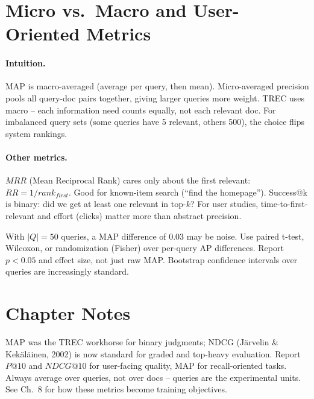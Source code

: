 
\section{Micro vs.\ Macro and User-Oriented Metrics}\label{sec:micro-macro}
\paragraph{Intuition.} MAP is macro-averaged (average per query, then mean). Micro-averaged precision pools all query-doc pairs together, giving larger queries more weight. TREC uses macro -- each information need counts equally, not each relevant doc. For imbalanced query sets (some queries have 5 relevant, others 500), the choice flips system rankings.

\paragraph{Other metrics.} $MRR$ (Mean Reciprocal Rank) cares only about the first relevant: $RR=1/rank_{first}$. Good for known-item search (``find the homepage''). Success@k is binary: did we get at least one relevant in top-$k$? For user studies, time-to-first-relevant and effort (clicks) matter more than abstract precision.

\begin{remark}
With $|Q|=50$ queries, a MAP difference of 0.03 may be noise. Use paired t-test, Wilcoxon, or randomization (Fisher) over per-query AP differences. Report $p<0.05$ and effect size, not just raw MAP. Bootstrap confidence intervals over queries are increasingly standard.
\end{remark}

\section{Chapter Notes}
MAP was the TREC workhorse for binary judgments; NDCG (J\"arvelin \& Kek\"al\"ainen, 2002) is now standard for graded and top-heavy evaluation. Report $P@10$ and $NDCG@10$ for user-facing quality, MAP for recall-oriented tasks. Always average over queries, not over docs -- queries are the experimental units. See Ch.~8 for how these metrics become training objectives.

